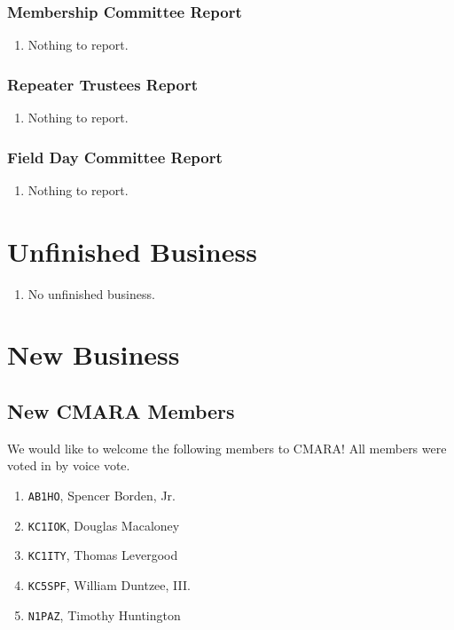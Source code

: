 \documentclass[10pt,letterpaper]{article}
\begin{document}
\subsubsection{Membership Committee Report}
\begin{enumerate}
  \item Nothing to report.
\end{enumerate}

\subsubsection{Repeater Trustees Report}
\begin{enumerate}
  \item Nothing to report.
\end{enumerate}

\subsubsection{Field Day Committee Report}
\begin{enumerate}
  \item Nothing to report.
\end{enumerate}

\section{Unfinished Business}
\begin{enumerate}
  \item No unfinished business.
\end{enumerate}

\section{New Business}

\subsection{New CMARA Members}
\label{new-cmara-members}
We would like to welcome the following members to CMARA! All members were voted in by voice vote.
\begin{enumerate}
  \item \texttt{AB1HO}, Spencer Borden, Jr.
  \item \texttt{KC1IOK}, Douglas Macaloney
  \item \texttt{KC1ITY}, Thomas Levergood
  \item \texttt{KC5SPF}, William Duntzee, III.
  \item \texttt{N1PAZ}, Timothy Huntington
\end{enumerate}
\end{document}
